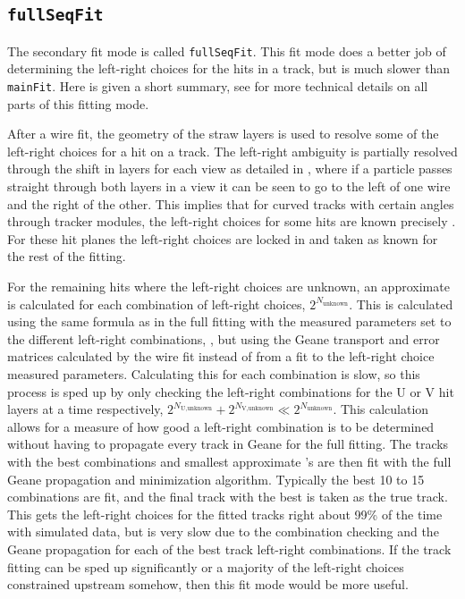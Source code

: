\subsection*{\texttt{fullSeqFit}}

The secondary fit mode is called \texttt{fullSeqFit}. This fit mode does a better job of determining the left-right choices for the hits in a track, but is much slower than \texttt{mainFit}. Here is given a short summary, see  for more technical details on all parts of this fitting mode.

After a wire fit, the geometry of the straw layers is used to resolve some of the left-right choices for a hit on a track. The left-right ambiguity is partially resolved through the shift in layers for each view as detailed in , where if a particle passes straight through both layers in a view it can be seen to go to the left of one wire and the right of the other. This implies that for curved tracks with certain angles through tracker modules, the left-right choices for some hits are known precisely \cite{JoeLR}. For these hit planes the left-right choices are locked in and taken as known for the rest of the fitting.

For the remaining hits where the left-right choices are unknown, an approximate \chisq is calculated for each combination of left-right choices, $2^{N_{\text{unknown}}}$. This \chisq is calculated using the same formula as in the full fitting 
with the measured parameters set to the different left-right combinations, , but using the Geane transport and error matrices calculated by the wire fit instead of from a fit to the left-right choice measured parameters. Calculating this \chisq for each combination is slow, so this process is sped up by only checking the left-right combinations for the U or V hit layers at a time respectively, $2^{N_{\text{U,unknown}}} + 2^{N_{\text{V,unknown}}} \ll 2^{N_{\text{unknown}}}$. This \chisq calculation allows for a measure of how good a left-right combination is to be determined without having to propagate every track in Geane for the full fitting. The tracks with the best combinations and smallest approximate \chisq's are then fit with the full Geane propagation and \chisq minimization algorithm. Typically the best 10 to 15 combinations are fit, and the final track with the best \chisq is taken as the true track. This gets the left-right choices for the fitted tracks right about 99\% of the time with simulated data, but is very slow due to the combination checking and the Geane propagation for each of the best track left-right combinations. If the track fitting can be sped up significantly or a majority of the left-right choices constrained upstream somehow, then this fit mode would be more useful. 




